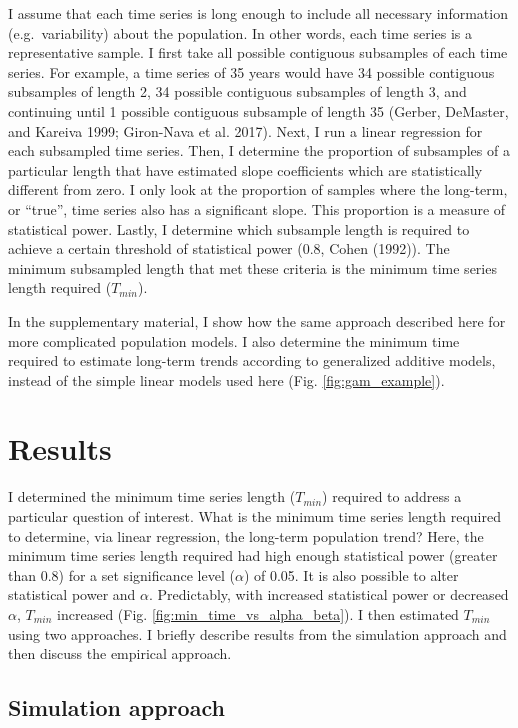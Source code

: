 \documentclass[12pt,]{article}
\begin{document}
\begin{spacing}{2}
I assume that each time series is long enough to include all necessary
information (e.g.~variability) about the population. In other words,
each time series is a representative sample. I first take all possible
contiguous subsamples of each time series. For example, a time series of
35 years would have 34 possible contiguous subsamples of length 2, 34
possible contiguous subsamples of length 3, and continuing until 1
possible contiguous subsample of length 35 (Gerber, DeMaster, and
Kareiva 1999; Giron-Nava et al. 2017). Next, I run a linear regression
for each subsampled time series. Then, I determine the proportion of
subsamples of a particular length that have estimated slope coefficients
which are statistically different from zero. I only look at the
proportion of samples where the long-term, or ``true'', time series also
has a significant slope. This proportion is a measure of statistical
power. Lastly, I determine which subsample length is required to achieve
a certain threshold of statistical power (0.8, Cohen (1992)). The
minimum subsampled length that met these criteria is the minimum time
series length required (\(T_{min}\)).

In the supplementary material, I show how the same approach described
here for more complicated population models. I also determine the
minimum time required to estimate long-term trends according to
generalized additive models, instead of the simple linear models used
here (Fig. \ref{fig:gam_example}).

\section{Results}\label{results}

I determined the minimum time series length (\(T_{min}\)) required to
address a particular question of interest. What is the minimum time
series length required to determine, via linear regression, the
long-term population trend? Here, the minimum time series length
required had high enough statistical power (greater than 0.8) for a set
significance level (\(\alpha\)) of 0.05. It is also possible to alter
statistical power and \(\alpha\). Predictably, with increased
statistical power or decreased \(\alpha\), \(T_{min}\) increased (Fig.
\ref{fig:min_time_vs_alpha_beta}). I then estimated \(T_{min}\) using
two approaches. I briefly describe results from the simulation approach
and then discuss the empirical approach.

\subsection{Simulation approach}\label{simulation-approach-1}


\end{spacing}
\end{document}

